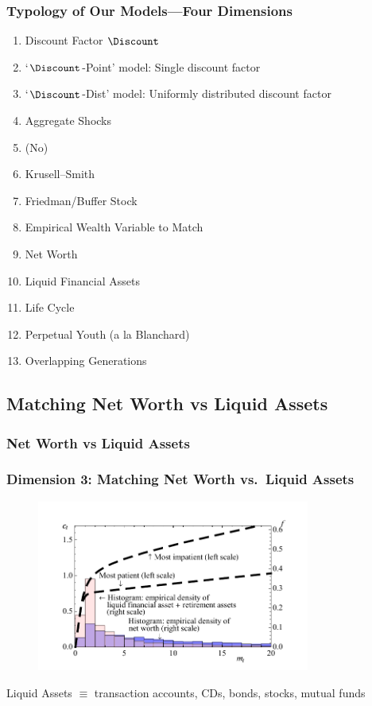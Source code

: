 \documentclass{beamer}
\newcommand{\jemph}[1]{{\color{jirkasred}#1}}
\begin{document}
\begin{frame}
\frametitle{{Typology of Our Models---{Four Dimensions}}}

\begin{block}{}\footnotesize
\begin{enumerate}
\item<0-0> \jemph{Discount Factor $\Discount$}
\bi \scriptsize
\item \jemph{`$\Discount$-Point' model:} Single discount factor
\item \jemph{`$\Discount$-Dist' model:} Uniformly distributed discount factor
\ei
\item<0-0> \jemph{Aggregate Shocks}
\bi \scriptsize
\item (No)
\item Krusell--Smith
\item Friedman/Buffer Stock
\ei
\item<1-> \jemph{Empirical Wealth Variable to Match}
\bi \scriptsize
\item Net Worth
\item Liquid Financial Assets
\ei
\item<0-0> \jemph{Life Cycle}
\bi \scriptsize
\item Perpetual Youth (a la Blanchard)
\item Overlapping Generations
\ei
\end{enumerate}
\end{block}

\end{frame}

\subsection{Matching Net Worth vs Liquid Assets}
\subsubsection{Net Worth vs Liquid Assets}
\begin{frame}[label=cfuncVsLiq]
\frametitle{Dimension 3: Matching Net Worth vs.\ Liquid Assets}
\begin{figure}
\centering
\includegraphics[width=0.8\textwidth]{../Figures/CFuncDistSevenPermAndHistNetWorthLiqFinPlsRetPlot.pdf}
\end{figure}
{\footnotesize Liquid Assets $\equiv$ transaction accounts,
CDs, bonds, stocks, mutual funds}
\end{frame}
\end{document}
